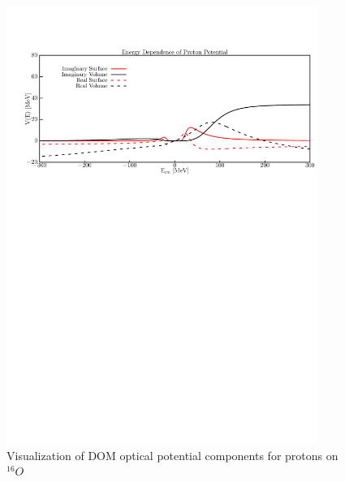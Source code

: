 \begin{figure}
\begin{center}
\includegraphics[width = 0.9\textwidth]{figures/o16_protonPotentials.png}
\caption{Visualization of DOM optical potential components for protons on
$^{16}O$}
\label{o16ProtonPotentials}
\end{center}
\end{figure}

